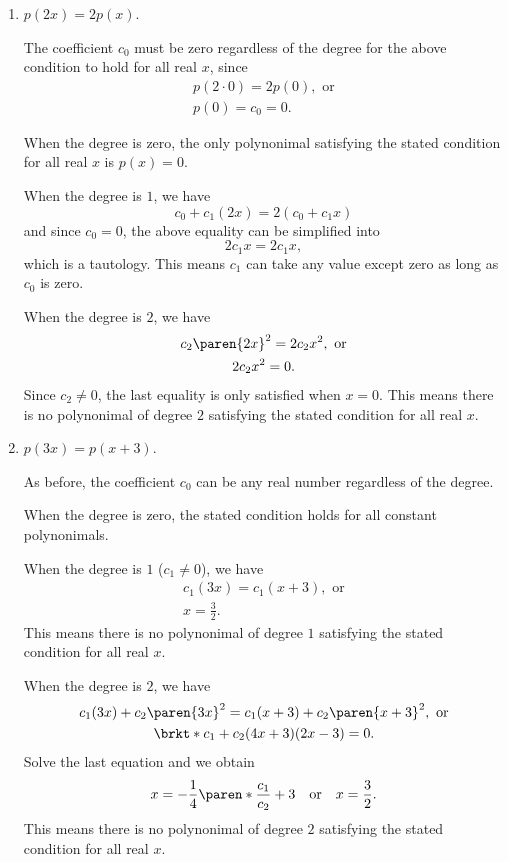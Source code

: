 \documentclass[a4paper]{article}
\begin{document}
\begin{enumerate}
\begin{enumerate}
  \item \(p(2x) = 2p(x)\).

    The coefficient \(c_0\) must be zero regardless of the degree for the
    above condition to hold for all real \(x\), since
    \begin{gather*}
      p(2\cdot 0) = 2p(0), \text{ or} \\
      p(0) = c_0 = 0.
    \end{gather*}

    When the degree is zero, the only polynonimal satisfying the stated
    condition for all real \(x\) is \(p(x) = 0\).

    When the degree is \(1\), we have
    \begin{displaymath}
      c_0 + c_1 (2x) = 2(c_0 + c_1 x)
    \end{displaymath}
    and since \(c_0 = 0\), the above equality can be simplified into
    \begin{displaymath}
      2 c_1 x = 2 c_1 x,
    \end{displaymath}
    which is a tautology.  This means \(c_1\) can take any value except
    zero as long as \(c_0\) is zero.

    When the degree is \(2\), we have
    \begin{gather*}
      c_2 \paren{2x}^2 = 2 c_2 x^2, \text{ or} \\
      2c_2x^2 = 0.
    \end{gather*}
    Since \(c_2 \ne 0\), the last equality is only satisfied when
    \(x = 0\).  This means there is no polynonimal of degree \(2\)
    satisfying the stated condition for all real \(x\).

  \item \(p(3x) = p(x+3)\).

    As before, the coefficient \(c_0\) can be any real number regardless
    of the degree.

    When the degree is zero, the stated condition holds for all constant
    polynonimals.

    When the degree is \(1\) (\(c_1 \ne 0\)), we have
    \begin{gather*}
      c_1 (3x) = c_1 (x+3), \text{ or} \\
      x = \frac32.
    \end{gather*}
    This means there is no polynonimal of degree \(1\) satisfying the
    stated condition for all real \(x\).

    When the degree is \(2\), we have
    \begin{gather*}
      c_1 (3x) + c_2 \paren{3x}^2 = c_1 (x+3) + c_2 \paren{x+3}^2, \text{ or} \\
      \brkt*{c_1 + c_2 (4x+3)} (2x-3) = 0.
    \end{gather*}
    Solve the last equation and we obtain
    \begin{displaymath}
      x = -\frac14 \paren*{\frac{c_1}{c_2} + 3} \quad \text{or} \quad x = \frac32.
    \end{displaymath}
    This means there is no polynonimal of degree \(2\) satisfying the
    stated condition for all real \(x\).
  \end{enumerate}


\end{enumerate}
\end{document}
